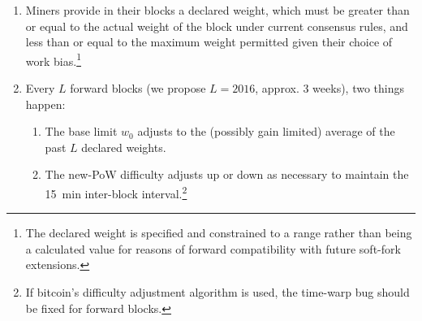 \begin{enumerate}
\begin{enumerate}
    \begin{equation} \label{rewardbiaseq}
      w(x) = w_0(2x - 4x^2)
    \end{equation}

    Equation~\eqref{rewardbiaseq} is depicted in
    Figure~\ref{rewardbiasfig}.

\begin{figure}
  \centering
  \texttt{[image: rewardbias.eps]}
  \caption{Offset reward as a function of difficulty bias.}
  \label{rewardbiasfig}
\end{figure}

Note that lowering the proof-of-work target, which permits slightly
larger blocks that are harder to find, is asymmetric with respect to
raising the target, which permits much smaller blocks that are easier
to find.  A non-linear equation is required for there to be a fixed
optimal value for a given transaction fee distribution.

The largest temporary block-weight increase that can be obtained is
+$25\%$, with a $+25\%$ bias to the proof-of-work target, whereas the
smallest temporary block-weight is $-75\%$ the default value, obtained
with a $-25\%$ bias.

Critically, this bias adjustment does not affect the representative
work of the block for the purpose of determining the most-work
chain. A miner cannot ``win out'' over another's block by choosing a
higher work bias.

  \item
    Miners provide in their blocks a declared weight, which must be
    greater than or equal to the actual weight of the block under
    current consensus rules, and less than or equal to the maximum
    weight permitted given their choice of work bias.\footnote{The
      declared weight is specified and constrained to a range rather
      than being a calculated value for reasons of forward
      compatibility with future soft-fork extensions.}

  \item
    Every $L$ forward blocks (we propose $L = 2016$, approx. \num{3}
    weeks), two things happen:

    \begin{enumerate}
      \item
        The base limit $w_0$ adjusts to the (possibly gain limited)
        average of the past $L$ declared weights.

      \item
        The new-PoW difficulty adjusts up or down as necessary to
        maintain the \SI{15}{\minute} inter-block
        interval.\footnote{If bitcoin's difficulty adjustment
          algorithm is used, the time-warp bug should be fixed for
          forward blocks.}
    \end{enumerate}
\end{enumerate}


\end{enumerate}
